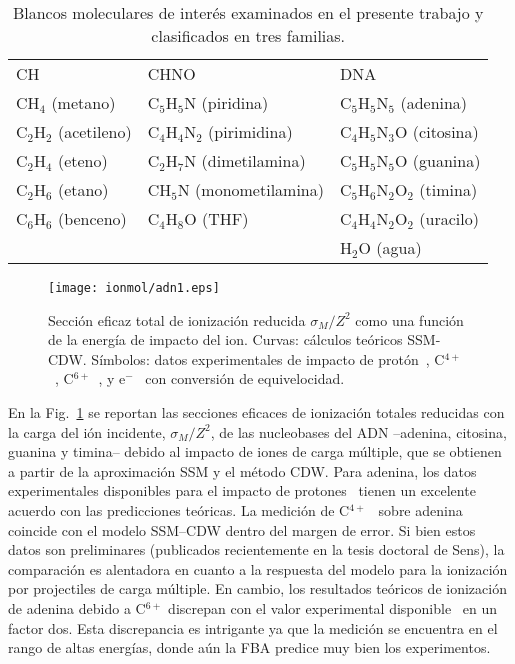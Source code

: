 \begin{table}
\begin{center}
\begin{tabularx}{\textwidth}{
>{\centering\arraybackslash}p{}
>{\centering\arraybackslash}p{}
>{\centering\arraybackslash}p{}}
\rowcolor{mydarkgray} 
CH & CHNO & DNA \\
CH$_4$ (metano) & C$_5$H$_5$N (piridina)       & C$_5$H$_5$N$_5$ (adenina) \\
\rowcolor{mygray} 
C$_2$H$_2$ (acetileno) & C$_4$H$_4$N$_2$ (pirimidina)     & C$_4$H$_5$N$_3$O (citosina) \\
C$_2$H$_4$ (eteno)     & C$_2$H$_7$N     (dimetilamina)   & C$_5$H$_5$N$_5$O (guanina) \\
\rowcolor{mygray} 
C$_2$H$_6$ (etano)     & CH$_5$N         (monometilamina) & C$_5$H$_6$N$_2$O$_2$ (timina) \\
C$_6$H$_6$ (benceno)   & C$_4$H$_8$O     (THF)            & C$_4$H$_4$N$_2$O$_2$ (uracilo) \\
\rowcolor{mygray} 
 & & H$_2$O (agua) \\
\end{tabularx}
\caption[Blancos moleculares examinados y clasificados en tres 
familias.]
{Blancos moleculares de interés examinados en el presente trabajo y 
clasificados en tres familias.}
\label{tab:families}
\end{center}
\end{table}

\begin{figure}
\centering
\texttt{[image: ionmol/adn1.eps]}
\caption[Sección eficaz total de ionización reducida por $Z$ (Parte I).]
{Sección eficaz total de ionización reducida $\sigma_{M}/Z^2$ como 
una función de la energía de impacto del ion. Curvas: cálculos teóricos 
SSM-CDW. Símbolos: datos experimentales de impacto de 
protón~\cite{Iriki:11}, 
C$^{4+}$~\cite{Sens:20}, C$^{6+}$~\cite{Bhattacharjee:19}, y 
e$^-$~\cite{Rahman:16} con conversión de equivelocidad.}
\label{fig:crossDNA_1}
\end{figure} 

En la Fig.~\ref{fig:crossDNA_1} se reportan las secciones eficaces de 
ionización totales reducidas con la carga del ión incidente, 
$\sigma_M/Z^2$, de las nucleobases del ADN --adenina, citosina, guanina 
y timina-- debido al impacto de iones de carga múltiple, que se obtienen 
a partir de la aproximación SSM y el método CDW. Para adenina, los datos 
experimentales disponibles para el impacto de protones~\cite{Iriki:11} 
tienen un excelente acuerdo con las predicciones teóricas. La medición de 
C$^{4+}$~\cite{Sens:20} sobre adenina coincide con el modelo SSM--CDW 
dentro del margen de error. Si bien estos datos son preliminares 
(publicados recientemente en la tesis doctoral de Sens), la comparación 
es alentadora en cuanto a la respuesta del modelo para la ionización por 
projectiles de carga múltiple. En cambio, los resultados teóricos de 
ionización de adenina debido a C$^{6+}$ discrepan con el valor 
experimental disponible~\cite{Bhattacharjee:19} en un factor dos. Esta 
discrepancia es intrigante ya que la medición se encuentra en el rango 
de altas energías, donde aún la FBA predice muy bien los experimentos.

